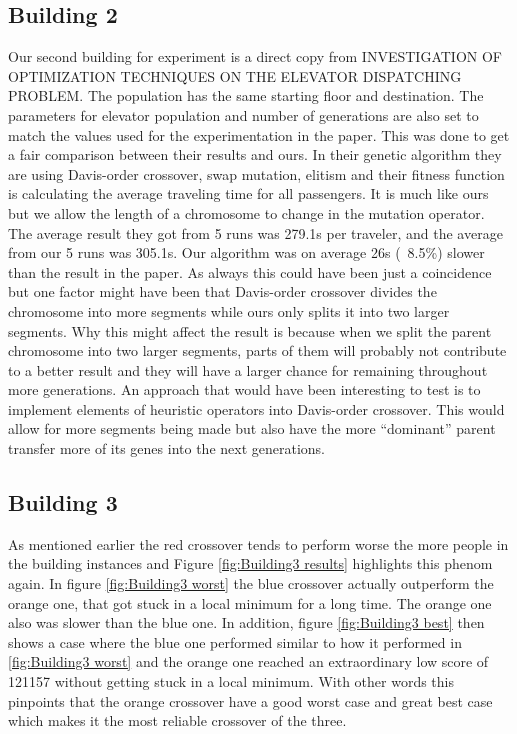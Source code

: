 \newpage

\subsection{Building 2}
Our second building for experiment is a direct copy from INVESTIGATION OF OPTIMIZATION TECHNIQUES ON THE ELEVATOR DISPATCHING PROBLEM. The population has the same starting floor and destination. The parameters for elevator population and number of generations are also set to match the values used for the experimentation in the paper. This was done to get a fair comparison between their results and ours. In their genetic algorithm they are using Davis-order crossover, swap mutation, elitism and their fitness function is calculating the average traveling time for all passengers. It is much like ours but we allow the length of a chromosome to change in the mutation operator. The average result they got from 5 runs was 279.1s per traveler, and the average from our 5 runs was 305.1s. Our algorithm was on average 26s (~8.5\%) slower than the result in the paper. As always this could have been just a coincidence but one factor might have been that Davis-order crossover divides the chromosome into more segments while ours only splits it into two larger segments. Why this might affect the result is because when we split the parent chromosome into two larger segments, parts of them will probably not contribute to a better result and they will have a larger chance for remaining throughout more generations. An approach that would have been interesting to test is to implement elements of heuristic operators into Davis-order crossover. This would allow for more segments being made but also have the more “dominant” parent transfer more of its genes into the next generations.

\newpage

\subsection{Building 3}
As mentioned earlier the red crossover tends to perform worse the more people in the building instances and Figure \ref{fig:Building3 results} highlights this phenom again. In figure \ref{fig:Building3 worst} the blue crossover actually outperform the orange one, that got stuck in a local minimum for a long time. The orange one also was slower than the blue one. In addition, figure \ref{fig:Building3 best} then shows a case where the blue one performed similar to how it performed in \ref{fig:Building3 worst} and the orange one reached an extraordinary low score of 121157 without getting stuck in a local minimum. With other words this pinpoints that the orange crossover have a good worst case and great best case which makes it the most reliable crossover of the three.


